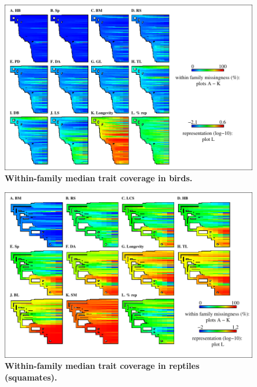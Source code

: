 \begin{figure}[h!]
\centering
\includegraphics[scale=1]{figures/chapter2/NA_phylo_patterns/Birds_coverage}
\caption[Within-family median trait coverage in birds]{\textbf{Within-family median trait coverage in birds.}}
\label{familycov_birds}
\end{figure}

\pagebreak

\begin{figure}[h!]
\centering
\includegraphics[scale=1]{figures/chapter2/NA_phylo_patterns/Reptiles_coverage}
\caption[Within-family median trait coverage in reptiles (squamates)]{\textbf{Within-family median trait coverage in reptiles (squamates).}}
\label{familycov_reptiles}
\end{figure}

